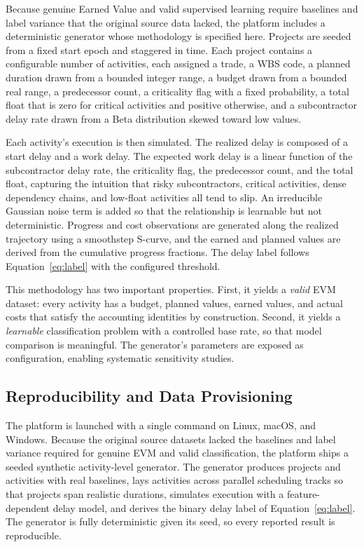 \documentclass[conference]{IEEEtran}
\begin{document}
Because genuine Earned Value and valid supervised learning require baselines and label variance that the original source data lacked, the platform includes a deterministic generator whose methodology is specified here. Projects are seeded from a fixed start epoch and staggered in time. Each project contains a configurable number of activities, each assigned a trade, a WBS code, a planned duration drawn from a bounded integer range, a budget drawn from a bounded real range, a predecessor count, a criticality flag with a fixed probability, a total float that is zero for critical activities and positive otherwise, and a subcontractor delay rate drawn from a Beta distribution skewed toward low values.

Each activity's execution is then simulated. The realized delay is composed of a start delay and a work delay. The expected work delay is a linear function of the subcontractor delay rate, the criticality flag, the predecessor count, and the total float, capturing the intuition that risky subcontractors, critical activities, dense dependency chains, and low-float activities all tend to slip. An irreducible Gaussian noise term is added so that the relationship is learnable but not deterministic. Progress and cost observations are generated along the realized trajectory using a smoothstep S-curve, and the earned and planned values are derived from the cumulative progress fractions. The delay label follows Equation~\eqref{eq:label} with the configured threshold.

This methodology has two important properties. First, it yields a \emph{valid} EVM dataset: every activity has a budget, planned values, earned values, and actual costs that satisfy the accounting identities by construction. Second, it yields a \emph{learnable} classification problem with a controlled base rate, so that model comparison is meaningful. The generator's parameters are exposed as configuration, enabling systematic sensitivity studies.

\subsection{Reproducibility and Data Provisioning}

The platform is launched with a single command on Linux, macOS, and Windows. Because the original source datasets lacked the baselines and label variance required for genuine EVM and valid classification, the platform ships a seeded synthetic activity-level generator. The generator produces projects and activities with real baselines, lays activities across parallel scheduling tracks so that projects span realistic durations, simulates execution with a feature-dependent delay model, and derives the binary delay label of Equation~\eqref{eq:label}. The generator is fully deterministic given its seed, so every reported result is reproducible.
\end{document}
